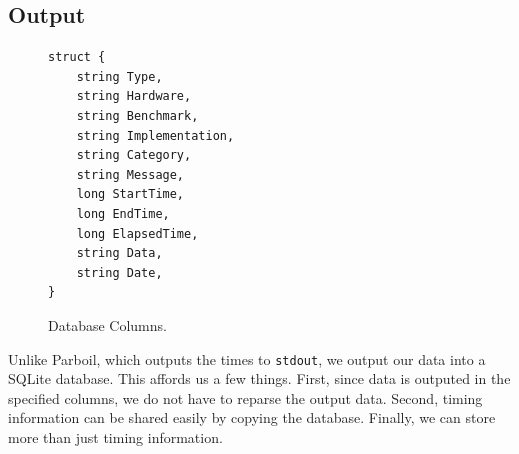 \subsection*{Output}


\begin{figure}[t!]
\begin{verbatim}
struct {
	string Type,
	string Hardware,
	string Benchmark,
	string Implementation,
	string Category,
	string Message,
	long StartTime,
	long EndTime,
	long ElapsedTime,
	string Data,
	string Date,
}
\end{verbatim}
\caption{Database Columns.}
\label{fig:database}
\centering
\end{figure}

Unlike Parboil, which outputs the times to {\tt stdout}, we output our data into a SQLite database.
This affords us a few things.
First, since data is outputed in the specified columns, we do not have to reparse the output data.
Second, timing information can be shared easily by copying the database.
Finally, we can store more than just timing information.

